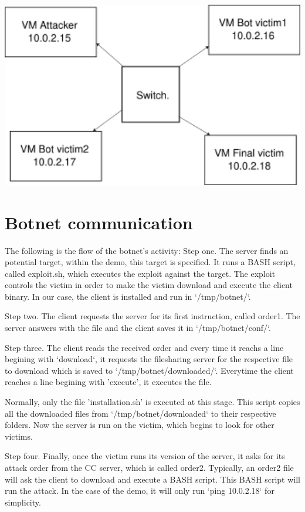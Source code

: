 \documentclass[../main.tex]{subfiles}
\begin{document}
    \includegraphics[width=450pt]{lab_env.png}


    \vspace{10pt}

    \section{Botnet communication}

    The following is the flow of the botnet's activity:
    Step one. 
    The server finds an potential target, within the demo, this target is specified.
    It runs a BASH script, called exploit.sh, which executes the exploit against the target.
    The exploit controls the victim in order to make the victim download and execute the client binary.
    In our case, the client is installed and run in `/tmp/botnet/`.

    Step two.
    The client requests the server for its first instruction, called order1.
    The server answers with the file and the client saves it in `/tmp/botnet/conf/`.

    Step three.
    The client reads the received order and every time it reachs a line begining with `download`, it requests the filesharing server for the respective file to download which is saved to `/tmp/botnet/downloaded/`.
    Everytime the client reaches a line begining with 'execute', it executes the file.

    Normally, only the file 'installation.sh' is executed at this stage.
    This script copies all the downloaded files from `/tmp/botnet/downloaded` to their respective folders.
    Now the server is run on the victim, which begins to look for other victims.

    Step four.
    Finally, once the victim runs its version of the server, it asks for its attack order from the CC server, which is called order2.
    Typically, an order2 file will ask the client to download and execute a BASH script.
    This BASH script will run the attack.
    In the case of the demo, it will only run `ping 10.0.2.18` for simplicity.
\end{document}
